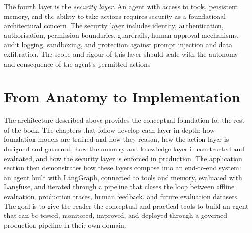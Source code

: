 The fourth layer is the \emph{security layer}. An agent with access to tools, persistent
memory, and the ability to take actions requires security as a foundational
architectural concern. The security layer includes identity, authentication,
authorisation, permission boundaries, guardrails, human approval mechanisms, audit
logging, sandboxing, and protection against prompt injection and data exfiltration. The
scope and rigour of this layer should scale with the autonomy and consequence of the
agent's permitted actions.

\section{From Anatomy to Implementation}

The architecture described above provides the conceptual foundation for the rest of the
book. The chapters that follow develop each layer in depth: how foundation models are
trained and how they reason, how the action layer is designed and governed, how the
memory and knowledge layer is constructed and evaluated, and how the security layer is
enforced in production. The application section then demonstrates how these layers
compose into an end-to-end system: an agent built with LangGraph, connected to tools
and memory, evaluated with Langfuse, and iterated through a pipeline that closes the
loop between offline evaluation, production traces, human feedback, and future evaluation
datasets. The goal is to give the reader the conceptual and practical tools to build an
agent that can be tested, monitored, improved, and deployed through a governed production
pipeline in their own domain.
